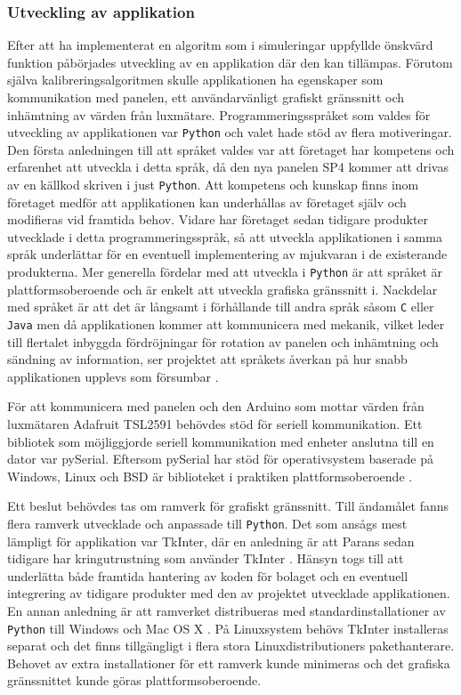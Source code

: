         \subsubsection{Utveckling av applikation} %
        \label{ssub:utveckling_av_applikation}
            Efter att ha implementerat en algoritm som i simuleringar uppfyllde önskvärd funktion påbörjades utveckling av en applikation där den kan tillämpas. Förutom själva kalibreringsalgoritmen skulle applikationen ha egenskaper som kommunikation med panelen, ett användarvänligt grafiskt gränssnitt och inhämtning av värden från luxmätare. Programmeringsspråket som valdes för utveckling av applikationen var \texttt{Python} och valet hade stöd av flera motiveringar. Den första anledningen till att språket valdes var att företaget har kompetens och erfarenhet att utveckla i detta språk, då den nya panelen SP4 kommer att drivas av en källkod skriven i just \texttt{Python}. Att kompetens och kunskap finns inom företaget medför att applikationen kan underhållas av företaget själv och modifieras vid framtida behov. Vidare har företaget sedan tidigare produkter utvecklade i detta programmeringsspråk, så att utveckla applikationen i samma språk underlättar för en eventuell implementering av mjukvaran i de existerande produkterna. Mer generella fördelar med att utveckla i \texttt{Python} är att språket är plattformsoberoende och är enkelt att utveckla grafiska gränssnitt i. Nackdelar med språket är att det är långsamt i förhållande till andra språk såsom \texttt{C} eller \texttt{Java} men då applikationen kommer att kommunicera med mekanik, vilket leder till flertalet inbyggda fördröjningar för rotation av panelen och inhämtning och sändning av information, ser projektet att språkets åverkan på hur snabb applikationen upplevs som försumbar \cite{python_speed}. \bigskip

            För att kommunicera med panelen och den Arduino som mottar värden från luxmätaren Adafruit TSL2591 behövdes stöd för seriell kommunikation. Ett bibliotek som möjliggjorde seriell kommunikation med enheter anslutna till en dator var pySerial. Eftersom pySerial har stöd för operativsystem baserade på Windows, Linux och BSD är biblioteket i praktiken plattformsoberoende \cite{pyserial}. \bigskip

            Ett beslut behövdes tas om ramverk för grafiskt gränssnitt. Till ändamålet fanns flera ramverk utvecklade och anpassade till \texttt{Python}. Det som ansågs mest lämpligt för applikation var TkInter, där en anledning är att Parans sedan tidigare har kringutrustning som använder TkInter \cite{solarremote}. Hänsyn togs till att underlätta både framtida hantering av koden för bolaget och en eventuell integrering av tidigare produkter med den av projektet utvecklade applikationen. En annan anledning är att ramverket distribueras med standardinstallationer av \texttt{Python} till Windows och Mac OS X \cite{tkinter}. På Linuxsystem behövs TkInter installeras separat och det finns tillgängligt i flera stora Linuxdistributioners pakethanterare. Behovet av extra installationer för ett ramverk kunde minimeras och det grafiska gränssnittet kunde göras plattformsoberoende. \bigskip

